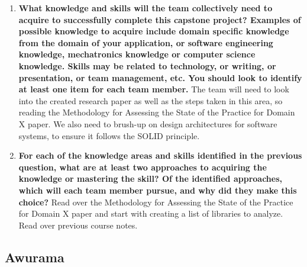 \begin{enumerate}
  \item \textbf{What knowledge and skills will the team collectively need to acquire to
  successfully complete this capstone project?  Examples of possible knowledge
  to acquire include domain specific knowledge from the domain of your
  application, or software engineering knowledge, mechatronics knowledge or
  computer science knowledge.  Skills may be related to technology, or writing,
  or presentation, or team management, etc.  You should look to identify at
  least one item for each team member.}
  The team will need to look into the created research paper as well as the steps taken in this area, so reading the Methodology for Assessing the State of the Practice for Domain X paper. We also need to brush-up on design architectures for software systems, to ensure it follows the SOLID principle.
  \item \textbf{For each of the knowledge areas and skills identified in the previous
  question, what are at least two approaches to acquiring the knowledge or
  mastering the skill?  Of the identified approaches, which will each team
  member pursue, and why did they make this choice?}
  Read over the Methodology for Assessing the State of the Practice for Domain X paper and start with creating a list of libraries to analyze. Read over previous course notes.
\end{enumerate}
\subsection*{Awurama}

